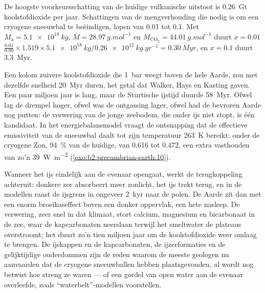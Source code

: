 \begin{example}\label{ex:b2:precambrian-earth:escape}
De hoogste voorkeursschatting van de huidige vulkanische uitstoot is \qty{0.26}{Gt}
koolstofdioxide per jaar. Schattingen van de
mengverhouding die nodig is om een cryogene sneeuwbal te beëindigen, lopen van 0.01 tot 0.1. Met $M_{\text{a}} =
\qty{5.1e18}{kg}$, $\bar M = \qty{28.97}{g.mol^{-1}}$ en $M_{\mathrm{CO_2}} =
\qty{44.01}{g.mol^{-1}}$ duurt $x = 0.01$ $\frac{0.01}{0.99}\times1.519\times\qty{5.1e18}{kg}
/ \qty{0.26e12}{kg.yr^{-1}} = \qty{0.30}{Myr}$, en $x = 0.1$ duurt \qty{3.3}{Myr}.
\end{example}

Een kolom zuivere koolstofdioxide die \qty{1}{bar} weegt boven de hele Aarde, zou met dezelfde snelheid
\qty{20}{Myr} duren, het getal dat Walker, Hays en Kasting gaven. Een paar miljoen jaar
is lang, maar de Sturtische ijstijd duurde \qty{58}{Myr}. Ofwel lag de drempel hoger, ofwel was de
ontgassing lager, ofwel had de bevroren Aarde nog putten: de verwering van de jonge zeebodem,
die onder ijs niet stopt, is één kandidaat. In het energiebalansmodel vraagt de ontsnapping dat
de effectieve emissiviteit van de sneeuwbal daalt tot zijn temperatuur \qty{263}{K} bereikt: onder
de cryogene Zon, \qty{94}{\percent} van de huidige, van 0.616 tot 0.472, een extra vasthouden van
zo'n \qty{39}{W.m^{-2}} (\cref{exo:b2:precambrian-earth:10}).

Wanneer het ijs eindelijk aan de evenaar opengaat, werkt de terugkoppeling achteruit: donkere zee absorbeert meer
zonlicht, het ijs trekt terug, en in de modellen raast de ijsgrens in ongeveer
\qty{2}{kyr} naar de polen. De Aarde zit dan met een enorm broeikaseffect boven een donker oppervlak, een hete
nasleep. De verwering, zeer snel in dat klimaat, stort calcium, magnesium en bicarbonaat in
de zee, waar de kapcarbonaten neerslaan terwijl het smeltwater de plateaus overstroomt; het duurt
zo'n tien miljoen jaar om de koolstofdioxide weer omlaag te brengen. De ijskappen en de
kapcarbonaten, de ijzerformaties en de gelijktijdige ouderdommen zijn de reden waarom de meeste geologen nu aanvaarden
dat de cryogene sneeuwballen hebben plaatsgevonden, al wordt nog betwist hoe streng ze waren --- of een gordel van open
water aan de evenaar overleefde, zoals ``waterbelt''-modellen voorstellen.

